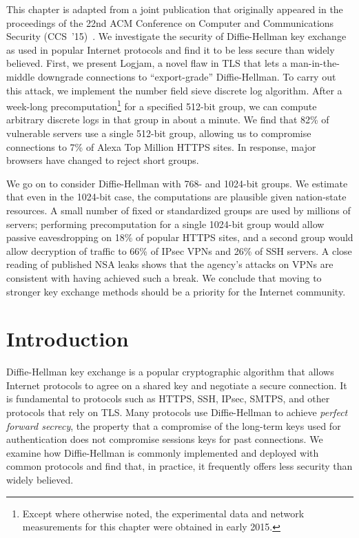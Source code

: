 
This chapter is adapted from a joint publication that originally appeared in
the proceedings of the 22nd ACM Conference on Computer and Communications
Security (CCS~'15)~\cite{logjam-2015}.
We investigate the security of Diffie-Hellman key exchange as used in popular
Internet protocols and find it to be less secure than widely believed. First,
we present Logjam, a novel flaw in TLS that lets a man-in-the-middle
downgrade connections to ``export-grade'' Diffie-Hellman. To carry out this
attack, we implement the number field sieve discrete log algorithm. After a
week-long precomputation\footnote{\small Except where otherwise noted, the
experimental data and network measurements for this chapter were obtained in
early 2015.} for a specified 512-bit group, we can compute arbitrary discrete
logs in that group in about a minute. We find that 82\% of vulnerable servers
use a single 512-bit group, allowing us to compromise connections to 7\% of
Alexa Top Million HTTPS sites. In response, major browsers have changed to
reject short groups.

We go on to consider Diffie-Hellman with 768- and 1024-bit groups. We
estimate that even in the 1024-bit case, the computations are plausible given
nation-state resources. A small number of fixed or standardized groups are
used by millions of servers; performing precomputation for a single 1024-bit
group would allow passive eavesdropping on 18\% of popular HTTPS sites, and a
second group would allow decryption of traffic to 66\% of IPsec VPNs and 26\%
of SSH servers. A close reading of published NSA leaks shows that the
agency's attacks on VPNs are consistent with having achieved such a break. We
conclude that moving to stronger key exchange methods should be a priority
for the Internet community.

\section{Introduction}

Diffie-Hellman key exchange is a popular cryptographic algorithm that allows
Internet protocols to agree on a shared key and negotiate a secure
connection. It is fundamental to protocols such as HTTPS, SSH, IPsec, SMTPS,
and other protocols that rely on TLS\@. Many protocols use Diffie-Hellman to
achieve \emph{perfect forward secrecy}, the property that a compromise of the
long-term keys used for authentication does not compromise sessions keys for
past connections. We examine how Diffie-Hellman is commonly implemented and
deployed with common protocols and find that, in practice, it frequently
offers less security than widely believed.

